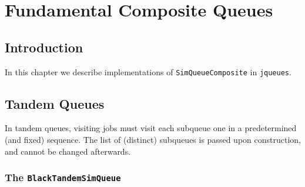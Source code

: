 \documentclass[12pt]{book}
\begin{document}
\chapter{Fundamental Composite Queues}

\section{Introduction}

In this chapter we describe implementations of
  \lstinline|SimQueueComposite| in \lstinline|jqueues|.

\section{Tandem Queues}

In tandem queues, visiting jobs must visit each subqueue one in a predetermined (and fixed) sequence.
The list of (distinct) subqueues is passed upon construction, and cannot be changed afterwards.

\subsection{The \lstinline{BlackTandemSimQueue}}
 
\end{document}
